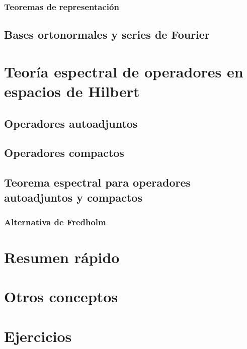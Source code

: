 \documentclass[palatino]{apuntes}
\begin{document}
\subsection{Teoremas de representación}

\section{Bases ortonormales y series de Fourier}

\chapter{Teoría espectral de operadores en espacios de Hilbert}

\section{Operadores autoadjuntos}

\section{Operadores compactos}

\section{Teorema espectral para operadores autoadjuntos y compactos}

\subsection{Alternativa de Fredholm}

\appendix

\chapter{Resumen rápido}


\chapter{Otros conceptos}


\chapter{Ejercicios}


\nocite{brezis2010functional,reed1980methods,rudin1991functional,ApuntesVarReal}
{}

\printindex
\end{document}
